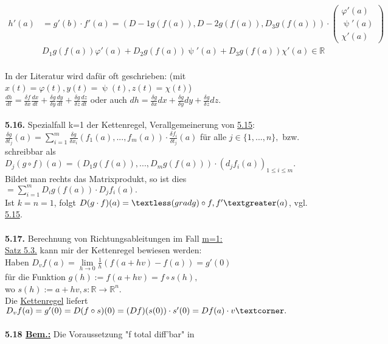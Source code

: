 \documentclass[]{scrartcl}
\begin{document}
\begin{align}
	h'(a)&=g'(b)\cdot f'(a)=(D-1g(f(a)), D-2g(f(a)),D_3g(f(a)))\cdot 
	\begin{pmatrix}
		\varphi'(a)\\\uppsi'(a)\\\chi'(a)
	\end{pmatrix}\\
	&D_1g(f(a))\varphi'(a)+D_2g(f(a))\uppsi'(a)+D_3 g(f(a))\chi'(a)\in 
	\mathbb{R}
\end{align}\\
In der Literatur wird dafür oft geschrieben: (mit 
$x(t)=\varphi(t),y(t)=\uppsi(t), z(t)=\chi(t)$)\\
$\frac{dh}{dt}=\frac{\delta f}{\delta x}\frac{d x}{d t}+\frac{\delta g}{\delta 
y}\frac{dy}{dt}+\frac{\delta g}{\delta z}\frac{dz}{dt}$ oder auch 
$dh=\frac{\delta g}{\delta x}dx+\frac{\delta g}{\delta y}dy+\frac{\delta 
g}{\delta z}dz.$\\
\\
\textbf{5.16.} Spezialfall k=1 der Kettenregel, Verallgemeinerung von 
 \ul{5.15}:\\
$\frac{\delta g}{\delta t_j}(a)=\sum_{i=1}^{m}\frac{\delta g}{\delta 
x_i}(f_1(a),...,f_m(a))\cdot\frac{\delta f_i}{\delta t_j}(a)$ für alle 
$j\in\{1,...,n\},$ bzw. schreibbar als $D_j(g\circ 
f)(a)=(D_1g(f(a)),...,D_mg(f(a)))\cdot(d_jf_i(a))_{1\leq i\leq m}.$\\
Bildet man rechts das Matrixprodukt, so ist dies $=\sum_{i=1}^{m} 
D_ig(f(a))\cdot D_jf_i(a).$\\
Ist $k=n=1$, folgt $D(g\cdot f)(a)=\textless(grad g)\circ f,f'\textgreater 
(a)$, vgl. \ul{5.15}.\\
\\
\textbf{5.17.} Berechnung von Richtungsableitungen im Fall 
\underline{\underline{m=1:}}\\
\ul{Satz 5.3.} kann mir der Kettenregel bewiesen werden:\\
\textopencorner Haben $D_vf(a)=\lim\limits_{h\rightarrow 
0}\frac{1}{h}(f(a+hv)-f(a))=g'(0)$\\
für die Funktion $g(h):=f(a+hv)=f\circ s(h),$\\
wo $s(h):=a+hv, s:\mathbb{R}\rightarrow\mathbb{R}^n.$\\
Die \ul{Kettenregel} liefert $D_vf(a)=g'(0)=D(f\circ s)(0)=(Df)(s(0))\cdot 
s'(0)=Df(a)\cdot v\textcorner.$\\
\\
\textbf{5.18 \underline{Bem.:}} Die Voraussetzung "f total diff'bar" in 
\end{document}
